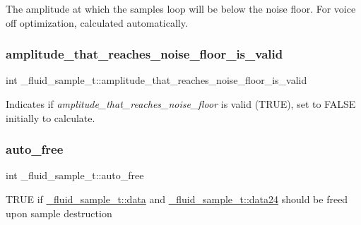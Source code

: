 The amplitude at which the sample\textquotesingle{}s loop will be below the noise floor. For voice off optimization, calculated automatically. \mbox{\label{struct__fluid__sample__t_ac054e203acd07ad158256e343f1fd0a5}} 
\subsubsection{\texorpdfstring{amplitude\+\_\+that\+\_\+reaches\+\_\+noise\+\_\+floor\+\_\+is\+\_\+valid}{amplitude\_that\_reaches\_noise\_floor\_is\_valid}}
{\footnotesize\ttfamily int \+\_\+fluid\+\_\+sample\+\_\+t\+::amplitude\+\_\+that\+\_\+reaches\+\_\+noise\+\_\+floor\+\_\+is\+\_\+valid}

Indicates if {\itshape amplitude\+\_\+that\+\_\+reaches\+\_\+noise\+\_\+floor} is valid (T\+R\+UE), set to F\+A\+L\+SE initially to calculate. \mbox{\label{struct__fluid__sample__t_a376e4ff95b5d7fd522c48417f15eb2a2}} 
\subsubsection{\texorpdfstring{auto\+\_\+free}{auto\_free}}
{\footnotesize\ttfamily int \+\_\+fluid\+\_\+sample\+\_\+t\+::auto\+\_\+free}

T\+R\+UE if \hyperlink{struct__fluid__sample__t_a8c7262f51500369fd1a3e5306b458d55}{\+\_\+fluid\+\_\+sample\+\_\+t\+::data} and \hyperlink{struct__fluid__sample__t_ad2153e233ec84d2ed36a310330eec820}{\+\_\+fluid\+\_\+sample\+\_\+t\+::data24} should be freed upon sample destruction \mbox{\label{struct__fluid__sample__t_a8c7262f51500369fd1a3e5306b458d55}} 
